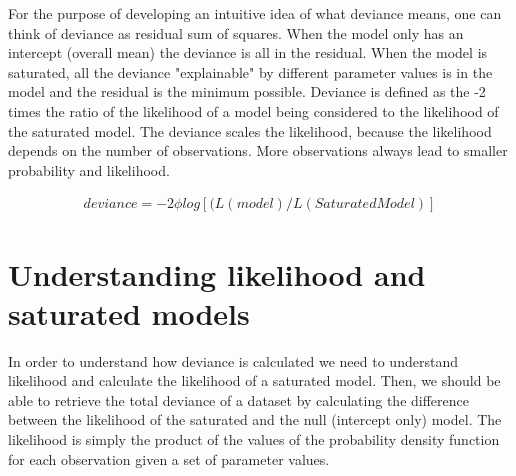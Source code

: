 \documentclass{article}
\begin{document}
For the purpose of developing an intuitive idea of what deviance means, one can think of deviance as residual sum of squares. When the model only has an intercept (overall mean) the deviance is all in the residual. When the model is saturated, all the deviance "explainable" by different parameter values is in the model and the residual is the minimum possible. Deviance is defined as the -2 times the ratio of the likelihood of a model being considered to the likelihood of the saturated model. The deviance scales the likelihood, because the likelihood depends on the number of observations. More observations always lead to smaller probability and likelihood.

\begin{eqnarray}
    deviance = -2 \phi log [(L(model)/L(SaturatedModel)]
    \label{deviance1}
\end{eqnarray}



\section{Understanding likelihood and saturated models}
In order to understand how deviance is calculated we need to understand likelihood and calculate the likelihood of a saturated model. Then, we should be able to retrieve the total deviance of a dataset by calculating the difference between the likelihood of the saturated and the null (intercept only) model. The likelihood is simply the product of the values of the probability density function for each observation given a set of parameter values.
\end{document}
